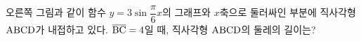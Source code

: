 \noindent\begin{minipage}[t]{0.58\linewidth}\vspace{0pt}\raggedright 오른쪽 그림과 같이 함수 $y=3\sin\dfrac{\pi}{6}x$의 그래프와 $x$축으로 둘러싸인 부분에 직사각형 $\mathrm{ABCD}$가 내접하고 있다. $\overline{\mathrm{BC}}=4$일 때, 직사각형 $\mathrm{ABCD}$의 둘레의 길이는?\end{minipage}\hfill\begin{minipage}[t]{0.4\linewidth}\vspace{0pt}\centering \resizebox{\ifdim\width>\linewidth\linewidth\else\width\fi}{!}{}\end{minipage}\par
{}
